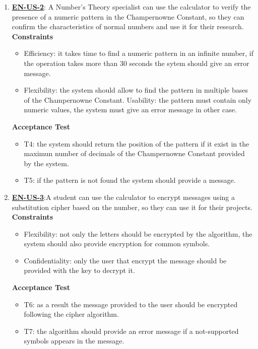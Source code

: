 \documentclass{report}
\begin{document}
\begin{enumerate}
\item \underline{\textbf{EN-US-2}}: A Number's Theory specialist can use the calculator to verify the presence of a numeric pattern in the Champernowne Constant, so they can confirm the characteristics of normal numbers and use it for their research. \\ \newline
\textbf{Constraints}
\begin{itemize}
    \item Efficiency: it takes time to find a numeric pattern in an infinite number, if the operation takes more than 30 seconds the sytem should give an error message. 
    \item Flexibility: the system should allow to find the pattern in multiple bases of the Champernowne Constant. Usability: the pattern must contain only numeric values, the system must give an error message in other case.
\end{itemize}

\textbf{Acceptance Test}
\begin{itemize}
    \item T4: the system should return the position of the pattern if it exist in the maximun number of decimals of the Champernowne Constant provided by the system. \item T5: if the pattern is not found the system should provide a message. \newline
\end{itemize}

\item \underline{\textbf{EN-US-3}}:A student can use the calculator to encrypt messages using a substitution cipher based on the number, so they can use it for their projects. \\ \newline
\textbf{Constraints}
\begin{itemize}
    \item Flexibility: not only the letters should be encrypted by the algorithm, the system should also provide encryption for common symbols. 
    \item Confidentiality: only the user that encrypt the message should be provided with the key to decrypt it.
\end{itemize}

\textbf{Acceptance Test}
\begin{itemize}
    \item T6: as a result the message provided to the user should be encrypted following the cipher algorithm.
    \item T7: the algorithm should provide an error message if a not-supported symbols appears in the message. \newline
\end{itemize}


\end{enumerate}
\end{document}
